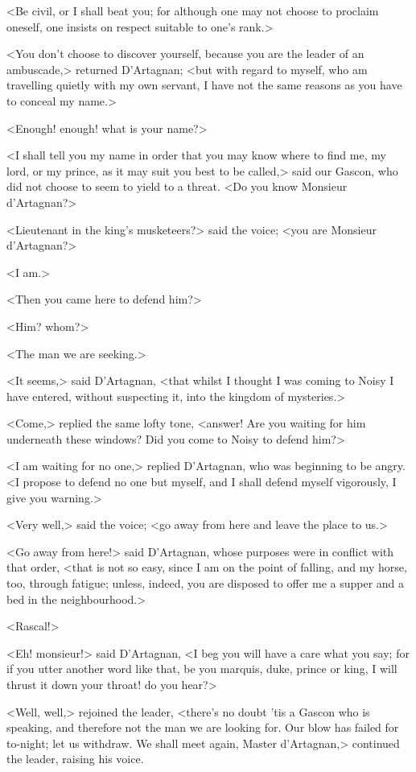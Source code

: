 <Be civil, or I shall beat you; for although one may not choose to proclaim oneself, one insists on respect suitable to one's rank.>

<You don't choose to discover yourself, because you are the leader of an ambuscade,> returned D'Artagnan; <but with regard to myself, who am travelling quietly with my own servant, I have not the same reasons as you have to conceal my name.>

<Enough! enough! what is your name?>

<I shall tell you my name in order that you may know where to find me, my lord, or my prince, as it may suit you best to be called,> said our Gascon, who did not choose to seem to yield to a threat. <Do you know Monsieur d'Artagnan?>

<Lieutenant in the king's musketeers?> said the voice; <you are Monsieur d'Artagnan?>

<I am.>

<Then you came here to defend him?>

<Him? whom?>

<The man we are seeking.>

<It seems,> said D'Artagnan, <that whilst I thought I was coming to Noisy I have entered, without suspecting it, into the kingdom of mysteries.>

<Come,> replied the same lofty tone, <answer! Are you waiting for him underneath these windows? Did you come to Noisy to defend him?>

<I am waiting for no one,> replied D'Artagnan, who was beginning to be angry. <I propose to defend no one but myself, and I shall defend myself vigorously, I give you warning.>

<Very well,> said the voice; <go away from here and leave the place to us.>

<Go away from here!> said D'Artagnan, whose purposes were in conflict with that order, <that is not so easy, since I am on the point of falling, and my horse, too, through fatigue; unless, indeed, you are disposed to offer me a supper and a bed in the neighbourhood.>

<Rascal!>

<Eh! monsieur!> said D'Artagnan, <I beg you will have a care what you say; for if you utter another word like that, be you marquis, duke, prince or king, I will thrust it down your throat! do you hear?>

<Well, well,> rejoined the leader, <there's no doubt 'tis a Gascon who is speaking, and therefore not the man we are looking for. Our blow has failed for to-night; let us withdraw. We shall meet again, Master d'Artagnan,> continued the leader, raising his voice.

